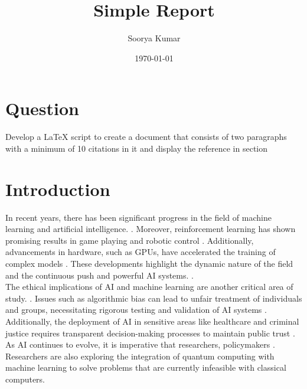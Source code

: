 \documentclass{article}
\title{Simple Report}
\author{Soorya Kumar}
\date{\today}
\begin{document}
	\maketitle
	
	\section*{Question}
		{\large Develop a LaTeX script to create a document that consists of two paragraphs with a minimum of 10
		citations in it and display the reference in section}
	
	\section{Introduction}
		In recent years, there has been significant progress in the field of machine learning and artificial intelligence.  \cite{lecun2015deep}. Moreover, reinforcement learning has shown promising results in game playing and robotic control \cite{sutton2018reinforcement, mnih2015human}. Additionally, advancements in hardware, such as GPUs, have accelerated the training of complex models \cite{krizhevsky2012imagenet}.  These developments highlight the dynamic nature of the field and the continuous push  and powerful AI systems.\cite{bonaccorso2018machine} \cite{russell2016artificial}.\\
		
		The ethical implications of AI and machine learning are another critical area of study.  \cite{mittelstadt2016ethics, jobin2019global}. Issues such as algorithmic bias can lead to unfair treatment of individuals and groups, necessitating rigorous testing and validation of AI systems \cite{toreini2020relationship}.  Additionally, the deployment of AI in sensitive areas like healthcare and criminal justice requires transparent decision-making processes to maintain public trust \cite{toreini2020relationship}. As AI continues to evolve, it is imperative that researchers, policymakers \cite{floridi2018ai}. Researchers are also exploring the integration of quantum computing with machine learning to solve problems that are currently infeasible with classical computers.
	
	
	
\end{document}
